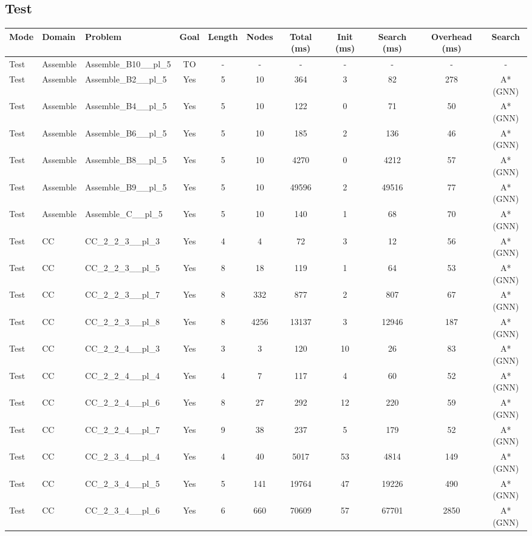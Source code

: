 \documentclass{article}
\begin{document}
\subsection*{Test}
\begin{tabular}{lllcccccccc}
\toprule
Mode & Domain & Problem & Goal & Length & Nodes & Total (ms) & Init (ms) & Search (ms) & Overhead (ms) & Search \\
\midrule
Test & Assemble & Assemble\_B10\_\_pl\_5 & TO & - & - & - & - & - & - & - \\
Test & Assemble & Assemble\_B2\_\_pl\_5 & Yes & 5 & 10 & 364 & 3 & 82 & 278 & A*(GNN) \\
Test & Assemble & Assemble\_B4\_\_pl\_5 & Yes & 5 & 10 & 122 & 0 & 71 & 50 & A*(GNN) \\
Test & Assemble & Assemble\_B6\_\_pl\_5 & Yes & 5 & 10 & 185 & 2 & 136 & 46 & A*(GNN) \\
Test & Assemble & Assemble\_B8\_\_pl\_5 & Yes & 5 & 10 & 4270 & 0 & 4212 & 57 & A*(GNN) \\
Test & Assemble & Assemble\_B9\_\_pl\_5 & Yes & 5 & 10 & 49596 & 2 & 49516 & 77 & A*(GNN) \\
Test & Assemble & Assemble\_C\_\_pl\_5 & Yes & 5 & 10 & 140 & 1 & 68 & 70 & A*(GNN) \\
Test & CC & CC\_2\_2\_3\_\_pl\_3 & Yes & 4 & 4 & 72 & 3 & 12 & 56 & A*(GNN) \\
Test & CC & CC\_2\_2\_3\_\_pl\_5 & Yes & 8 & 18 & 119 & 1 & 64 & 53 & A*(GNN) \\
Test & CC & CC\_2\_2\_3\_\_pl\_7 & Yes & 8 & 332 & 877 & 2 & 807 & 67 & A*(GNN) \\
Test & CC & CC\_2\_2\_3\_\_pl\_8 & Yes & 8 & 4256 & 13137 & 3 & 12946 & 187 & A*(GNN) \\
Test & CC & CC\_2\_2\_4\_\_pl\_3 & Yes & 3 & 3 & 120 & 10 & 26 & 83 & A*(GNN) \\
Test & CC & CC\_2\_2\_4\_\_pl\_4 & Yes & 4 & 7 & 117 & 4 & 60 & 52 & A*(GNN) \\
Test & CC & CC\_2\_2\_4\_\_pl\_6 & Yes & 8 & 27 & 292 & 12 & 220 & 59 & A*(GNN) \\
Test & CC & CC\_2\_2\_4\_\_pl\_7 & Yes & 9 & 38 & 237 & 5 & 179 & 52 & A*(GNN) \\
Test & CC & CC\_2\_3\_4\_\_pl\_4 & Yes & 4 & 40 & 5017 & 53 & 4814 & 149 & A*(GNN) \\
Test & CC & CC\_2\_3\_4\_\_pl\_5 & Yes & 5 & 141 & 19764 & 47 & 19226 & 490 & A*(GNN) \\
Test & CC & CC\_2\_3\_4\_\_pl\_6 & Yes & 6 & 660 & 70609 & 57 & 67701 & 2850 & A*(GNN) \\

\end{tabular}
\end{document}

